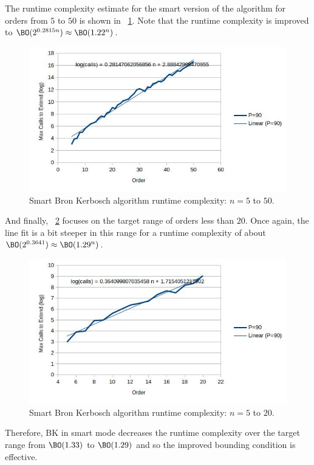 The runtime complexity estimate for the smart version of the algorithm for orders from \(5\) to \(50\) is shown in
\figurename~\ref{fig:bron2:runtime}.  Note that the runtime complexity is improved to
\(\BO(2^{0.2815n})\approx\BO(1.22^n)\).

\begin{figure}[H]
  \centering
  \includegraphics[width=5in]{bron2_runtime}
  \caption{Smart Bron Kerbosch algorithm runtime complexity: \(n=5\) to \(50\).}
  \label{fig:bron2:runtime}
\end{figure}

And finally, \figurename~\ref{fig:bron2:runtime2} focuses on the target range of orders less than \(20\).  Once
again, the line fit is a bit steeper in this range for a runtime complexity of about
\(\BO(2^{0.3641})\approx\BO(1.29^n)\).

\begin{figure}[H]
  \centering
  \includegraphics[width=5in]{bron2_runtime_2}
  \caption{Smart Bron Kerbosch algorithm runtime complexity: \(n=5\) to \(20\).}
  \label{fig:bron2:runtime2}
\end{figure}

Therefore, BK in smart mode decreases the runtime complexity over the target range from \(\BO(1.33)\) to
\(\BO(1.29)\) and so the improved bounding condition is effective.

